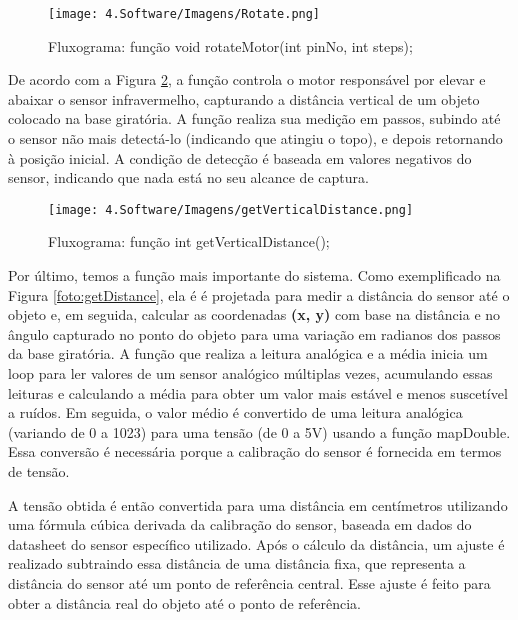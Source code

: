 \begin{figure}[H]
\captionsetup{width=0.6\textwidth}%
\caption{Fluxograma: função void rotateMotor(int pinNo, int steps);}%
\label{foto:rotate}%
\texttt{[image: 4.Software/Imagens/Rotate.png]}%
\end{figure}

De acordo com a Figura  \ref{foto:getVertical}, a função controla o motor responsável por elevar e abaixar o sensor infravermelho, capturando a distância vertical de um objeto colocado na base giratória. A função realiza sua medição em passos, subindo até o sensor não mais detectá-lo (indicando que atingiu o topo), e depois retornando à posição inicial. A condição de detecção é baseada em valores negativos do sensor, indicando que nada está no seu alcance de captura.

\begin{figure}[H]
\centering
\captionsetup{width=0.6\textwidth} %
\texttt{[image: 4.Software/Imagens/getVerticalDistance.png]} %
\caption{Fluxograma: função int getVerticalDistance();}
\label{foto:getVertical}
\end{figure}

Por último, temos a função mais importante do sistema. Como exemplificado na Figura \ref{foto:getDistance}, ela é é projetada para medir a distância do sensor até o objeto e, em seguida, calcular as coordenadas \textbf{(x, y)} com base na distância e no ângulo capturado no ponto do objeto para uma variação em radianos dos passos da base giratória.
A função que realiza a leitura analógica e a média inicia um loop para ler valores de um sensor analógico múltiplas vezes, acumulando essas leituras e calculando a média para obter um valor mais estável e menos suscetível a ruídos. Em seguida, o valor médio é convertido de uma leitura analógica (variando de 0 a 1023) para uma tensão (de 0 a 5V) usando a função mapDouble. Essa conversão é necessária porque a calibração do sensor é fornecida em termos de tensão.

A tensão obtida é então convertida para uma distância em centímetros utilizando uma fórmula cúbica derivada da calibração do sensor, baseada em dados do datasheet do sensor específico utilizado. Após o cálculo da distância, um ajuste é realizado subtraindo essa distância de uma distância fixa, que representa a distância do sensor até um ponto de referência central. Esse ajuste é feito para obter a distância real do objeto até o ponto de referência.

